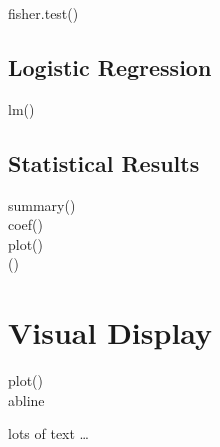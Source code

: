 \documentclass{article}
\begin{document}
\begin{multicols}{3}
\begin{description}
\item[fisher.test()]
\end{description}

\subsection*{Logistic Regression}

\begin{description}
\item[lm()]
\end{description}

\subsection*{Statistical Results}
\begin{description}
\item[summary()]
\item[coef()]
\item[plot()]
\item[()]
\end{description}

\section*{Visual Display}

\begin{description}
\item[plot()]
\item[abline{}]

\end{description}


  lots of text
  \ldots
\end{multicols}
\end{document}
